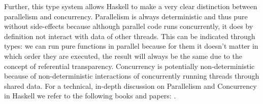 Further, this type system allows Haskell to make a very clear distinction between parallelism and concurrency. Parallelism is always deterministic and thus pure without side-effects because although parallel code runs concurrently, it does by definition not interact with data of other threads. This can be indicated through types: we can run pure functions in parallel because for them it doesn't matter in which order they are executed, the result will always be the same due to the concept of referential transparency. Concurrency is potentially non-deterministic because of non-deterministic interactions of concurrently running threads through shared data. For a technical, in-depth discussion on Parallelism and Concurrency in Haskell we refer to the following books and papers: \cite{marlow_parallel_2013,osullivan_real_2008,harris_composable_2005,marlow_runtime_2009}.